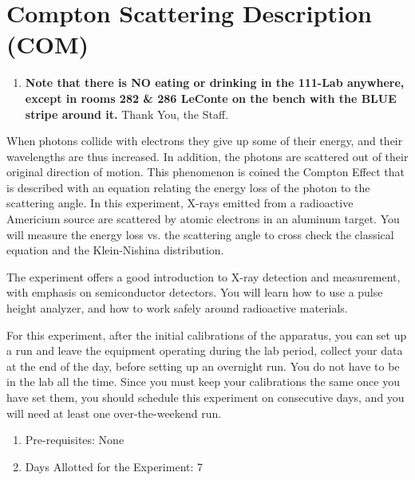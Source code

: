 \documentclass{../lab}
\begin{document}
\maketitle

\tableofcontents

\section{Compton Scattering Description (COM)}

\begin{enumerate}
    \item \textbf{Note that there is NO eating or drinking in the 111-Lab anywhere, except in rooms 282 \& 286 LeConte on the bench with the BLUE stripe around it.} Thank You, the Staff.

\end{enumerate}

When photons collide with electrons they give up some of their energy, and their wavelengths are thus increased. In addition, the photons are scattered out of their original direction of motion. This phenomenon is coined the Compton Effect that is described with an equation relating the energy loss of the photon to the scattering angle. In this experiment, X-rays emitted from a radioactive Americium source are scattered by atomic electrons in an aluminum target. You will measure the energy loss vs. the scattering angle to cross check the classical equation and the Klein-Nishina distribution.

The experiment offers a good introduction to X-ray detection and measurement, with emphasis on semiconductor detectors. You will learn how to use a pulse height analyzer, and how to work safely around radioactive materials.

For this experiment, after the initial calibrations of the apparatus, you can set up a run and leave the equipment operating during the lab period, collect your data at the end of the day, before setting up an overnight run. You do not have to be in the lab all the time. Since you must keep your calibrations the same once you have set them, you should schedule this experiment on consecutive days, and you will need at least one over-the-weekend run.

\begin{enumerate}
    \item Pre-requisites: None

    \item Days Allotted for the Experiment: 7

\end{enumerate}
\end{document}
